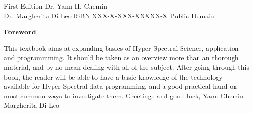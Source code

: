 \documentclass[10pt]{book}
\begin{document}
First Edition\newline\linebreak
Dr. Yann H. Chemin\\Dr. Margherita Di Leo\newline\linebreak
ISBN  XXX-X-XXX-XXXXX-X\newline\linebreak
Public Domain\newline
\newpage
\begin{center}
 \textbf{Foreword}
\end{center}
This textbook aims at expanding basics of Hyper Spectral Science, application and programmming.
It should be taken as an overview more than an thorough material, and by no mean dealing with all of the subject. 
\newline\linebreak
After going through this book, the reader will be able to have a basic knowledge of the technology available
for Hyper Spectral data programming, and a good practical hand on most common ways to investigate them.
\newline\linebreak
Greetings and good luck,\newline
Yann Chemin\\Margherita Di Leo\newline\linebreak
\tableofcontents
\newpage
\end{document}
